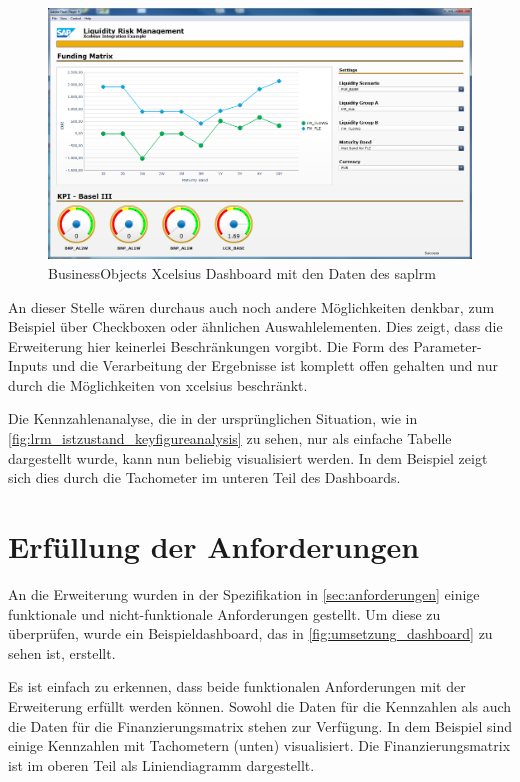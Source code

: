 \begin{onehalfspacing}
\begin{figure}[ht]
\centering
\setlength{\unitlength}{1mm}
\includegraphics[width=15cm]{images/dashboard_preview.PNG}
\caption{BusinessObjects Xcelsius Dashboard mit den Daten des \gls{saplrm}\label{fig:umsetzung_dashboard}}
\end{figure}

An dieser Stelle wären durchaus auch noch andere Möglichkeiten denkbar, zum Beispiel über Checkboxen oder ähnlichen Auswahlelementen. Dies zeigt, dass die Erweiterung hier keinerlei Beschränkungen vorgibt. Die Form des Parameter-Inputs und die Verarbeitung der Ergebnisse ist komplett offen gehalten und nur durch die Möglichkeiten von \gls{xcelsius} beschränkt.

Die Kennzahlenanalyse, die in der ursprünglichen Situation, wie in \vref{fig:lrm_istzustand_keyfigureanalysis} zu sehen, nur als einfache Tabelle dargestellt wurde, kann nun beliebig visualisiert werden. In dem Beispiel zeigt sich dies durch die Tachometer im unteren Teil des Dashboards.

\section{Erfüllung der Anforderungen}
An die Erweiterung wurden in der Spezifikation in \vref{sec:anforderungen} einige funktionale und nicht-funktionale Anforderungen gestellt. Um diese zu überprüfen, wurde ein Beispieldashboard, das in \vref{fig:umsetzung_dashboard} zu sehen ist, erstellt.

Es ist einfach zu erkennen, dass beide funktionalen Anforderungen mit der Erweiterung erfüllt werden können. Sowohl die Daten für die Kennzahlen als auch die Daten für die Finanzierungsmatrix stehen zur Verfügung. In dem Beispiel sind einige Kennzahlen mit Tachometern (unten) visualisiert. Die Finanzierungsmatrix ist im oberen Teil als Liniendiagramm dargestellt.


\end{onehalfspacing}
